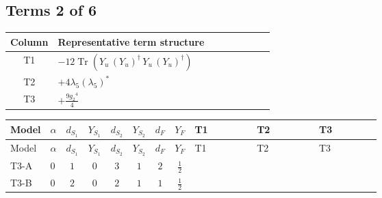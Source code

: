 \documentclass[8pt]{article}
\begin{document}
\begin{landscape}
\subsection*{Terms 2 of 6}
\begin{center}
\begin{tabular}{@{}c >{\raggedright\arraybackslash}p{0.82\linewidth}@{}}
\toprule
Column & Representative term structure \\
\midrule
T1 & \(\displaystyle -12 \operatorname{Tr}\!\left({Y_u}\,\left({Y_u}\right)^{\dagger}\,{Y_u}\,\left({Y_u}\right)^{\dagger}\right)\) \\
\midrule
T2 & \(\displaystyle +4 {\lambda_5} \left({\lambda_5}\right)^{*}\) \\
\midrule
T3 & \(\displaystyle +\frac{9 {g_2}^4}{4}\) \\
\midrule
\bottomrule
\end{tabular}
\end{center}
\smallskip
\tiny
\begin{longtable}{@{}llcccccc >{\raggedright\arraybackslash}p{0.21\linewidth} >{\raggedright\arraybackslash}p{0.21\linewidth} >{\raggedright\arraybackslash}p{0.21\linewidth}@{}}
\toprule
Model & $\alpha$ & $d_{S_1}$ & $Y_{S_1}$ & $d_{S_2}$ & $Y_{S_2}$ & $d_F$ & $Y_F$ & T1 & T2 & T3 \\
\midrule
\endfirsthead
\toprule
Model & $\alpha$ & $d_{S_1}$ & $Y_{S_1}$ & $d_{S_2}$ & $Y_{S_2}$ & $d_F$ & $Y_F$ & T1 & T2 & T3 \\
\midrule
\endhead
T3-A & $0$ & $1$ & $0$ & $3$ & $1$ & $2$ & $\frac{1}{2}$ & \scriptsize\adjustbox{max width=\linewidth}{$\begin{gathered} -12 \operatorname{Tr}\!\left({Y_u}\,\left({Y_u}\right)^{\dagger}\,{Y_u}\,\left({Y_u}\right)^{\dagger}\right)\end{gathered}$} & \scriptsize\adjustbox{max width=\linewidth}{$\begin{gathered} +4 {\lambda_5} \left({\lambda_5}\right)^{*}\end{gathered}$} & \scriptsize\adjustbox{max width=\linewidth}{$\begin{gathered} +\frac{9 {g_2}^4}{4}\end{gathered}$} \\
\midrule
T3-B & $0$ & $2$ & $0$ & $2$ & $1$ & $1$ & $\frac{1}{2}$ & \scriptsize\adjustbox{max width=\linewidth}{$\begin{gathered} -12 \operatorname{Tr}\!\left({Y_u}\,\left({Y_u}\right)^{\dagger}\,{Y_u}\,\left({Y_u}\right)^{\dagger}\right)\end{gathered}$} & \scriptsize\adjustbox{max width=\linewidth}{$\begin{gathered} +4 {\lambda_5} \left({\lambda_5}\right)^{*}\end{gathered}$} & \scriptsize\adjustbox{max width=\linewidth}{$\begin{gathered} +\frac{9 {g_2}^4}{4}\end{gathered}$} \\

\end{longtable}
\end{landscape}
\end{document}
